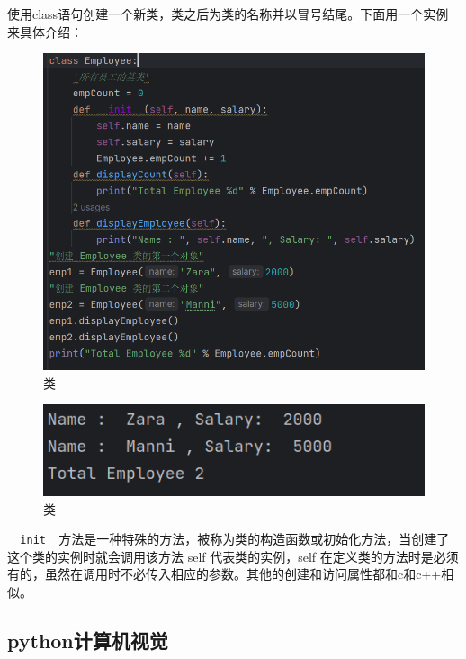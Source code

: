 \documentclass{ctexart}
\begin{document}
	使用class语句创建一个新类，类之后为类的名称并以冒号结尾。下面用一个实例来具体介绍：
	
	\begin{figure}[H]
		\centering
		\includegraphics[scale=0.5]{3.72}
		\caption{类}
	\end{figure}
	
	\begin{figure}[H]
		\centering
		\includegraphics[scale=0.5]{3.73}
		\caption{类}
	\end{figure}
	
	\verb|__init__|方法是一种特殊的方法，被称为类的构造函数或初始化方法，当创建了这个类的实例时就会调用该方法
	self 代表类的实例，self 在定义类的方法时是必须有的，虽然在调用时不必传入相应的参数。其他的创建和访问属性都和c和c++相似。
	
	
	
	\subsection{python计算机视觉}
\end{document}
